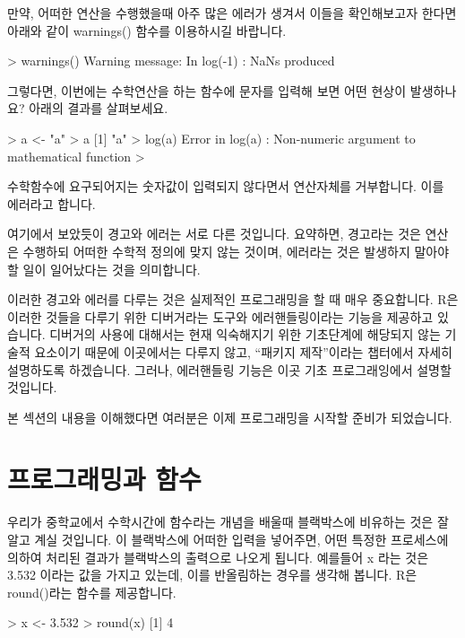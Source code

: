 \documentclass{book}
\begin{document}
만약, 어떠한 연산을 수행했을때 아주 많은 에러가 생겨서 이들을 확인해보고자 한다면 아래와 같이 warnings() 함수를 이용하시길 바랍니다. 

\begin{Schunk}
\begin{Soutput}
> warnings()
Warning message:
In log(-1) : NaNs produced
\end{Soutput}
\end{Schunk}

그렇다면, 이번에는 수학연산을 하는 함수에 문자를 입력해 보면 어떤 현상이 발생하나요? 
아래의 결과를 살펴보세요.

\begin{Schunk}
\begin{Soutput}
> a <- "a"
> a
[1] "a"
> log(a)
Error in log(a) : Non-numeric argument to mathematical function
> 
\end{Soutput}
\end{Schunk}

수학함수에 요구되어지는 숫자값이 입력되지 않다면서 연산자체를 거부합니다. 
이를 에러라고 합니다. 

여기에서 보았듯이 경고와 에러는 서로 다른 것입니다.
요약하면, 경고라는 것은 연산은 수행하되 어떠한 수학적 정의에 맞지 않는 것이며, 에러라는 것은 발생하지 말아야할 일이 일어났다는 것을 의미합니다. 

이러한 경고와 에러를 다루는 것은 실제적인 프로그래밍을 할 때 매우 중요합니다. 
R은 이러한 것들을 다루기 위한 디버거라는 도구와 에러핸들링이라는 기능을 제공하고 있습니다.
디버거의 사용에 대해서는 현재 익숙해지기 위한 기초단계에 해당되지 않는 기술적 요소이기 때문에 이곳에서는 다루지 않고, 
``패키지 제작''이라는 챕터에서 자세히 설명하도록 하겠습니다. 
그러나, 에러핸들링 기능은 이곳 기초 프로그래잉에서 설명할 것입니다. 

본 섹션의 내용을 이해했다면 여러분은 이제 프로그래밍을 시작할 준비가 되었습니다. 

\section{프로그래밍과 함수}

우리가 중학교에서 수학시간에 함수라는 개념을 배울때 블랙박스에 비유하는 것은 잘 알고 계실 것입니다. 
이 블랙박스에 어떠한 입력을 넣어주면, 어떤 특정한 프로세스에 의하여 처리된 결과가 블랙박스의 출력으로 나오게 됩니다. 
예를들어 x 라는 것은 3.532 이라는 값을 가지고 있는데, 이를 반올림하는 경우를 생각해 봅니다.
R은 round()라는 함수를 제공합니다. 

\begin{Schunk}
\begin{Soutput}
> x <- 3.532
> round(x)
[1] 4
\end{Soutput}
\end{Schunk}
\end{document}
